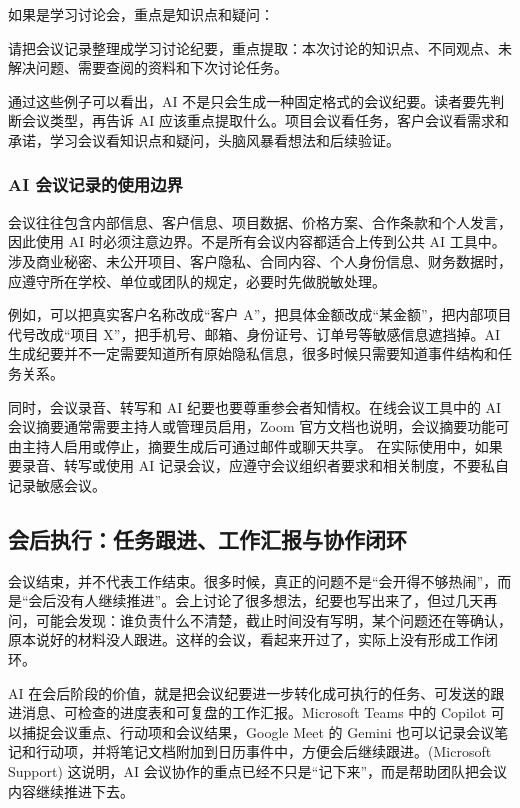 如果是学习讨论会，重点是知识点和疑问：
\begin{tcolorbox}[promptbox]
请把会议记录整理成学习讨论纪要，重点提取：本次讨论的知识点、不同观点、未解决问题、需要查阅的资料和下次讨论任务。
\end{tcolorbox}

通过这些例子可以看出，AI 不是只会生成一种固定格式的会议纪要。读者要先判断会议类型，再告诉 AI 应该重点提取什么。项目会议看任务，客户会议看需求和承诺，学习会议看知识点和疑问，头脑风暴看想法和后续验证。

\subsubsection*{AI 会议记录的使用边界}

会议往往包含内部信息、客户信息、项目数据、价格方案、合作条款和个人发言，因此使用 AI 时必须注意边界。不是所有会议内容都适合上传到公共 AI 工具中。涉及商业秘密、未公开项目、客户隐私、合同内容、个人身份信息、财务数据时，应遵守所在学校、单位或团队的规定，必要时先做脱敏处理。

例如，可以把真实客户名称改成“客户 A”，把具体金额改成“某金额”，把内部项目代号改成“项目 X”，把手机号、邮箱、身份证号、订单号等敏感信息遮挡掉。AI 生成纪要并不一定需要知道所有原始隐私信息，很多时候只需要知道事件结构和任务关系。

同时，会议录音、转写和 AI 纪要也要尊重参会者知情权。在线会议工具中的 AI 会议摘要通常需要主持人或管理员启用，Zoom 官方文档也说明，会议摘要功能可由主持人启用或停止，摘要生成后可通过邮件或聊天共享。 在实际使用中，如果要录音、转写或使用 AI 记录会议，应遵守会议组织者要求和相关制度，不要私自记录敏感会议。




\subsection{会后执行：任务跟进、工作汇报与协作闭环}

会议结束，并不代表工作结束。很多时候，真正的问题不是“会开得不够热闹”，而是“会后没有人继续推进”。会上讨论了很多想法，纪要也写出来了，但过几天再问，可能会发现：谁负责什么不清楚，截止时间没有写明，某个问题还在等确认，原本说好的材料没人跟进。这样的会议，看起来开过了，实际上没有形成工作闭环。

AI 在会后阶段的价值，就是把会议纪要进一步转化成可执行的任务、可发送的跟进消息、可检查的进度表和可复盘的工作汇报。Microsoft Teams 中的 Copilot 可以捕捉会议重点、行动项和会议结果，Google Meet 的 Gemini 也可以记录会议笔记和行动项，并将笔记文档附加到日历事件中，方便会后继续跟进。(Microsoft Support) 这说明，AI 会议协作的重点已经不只是“记下来”，而是帮助团队把会议内容继续推进下去。

